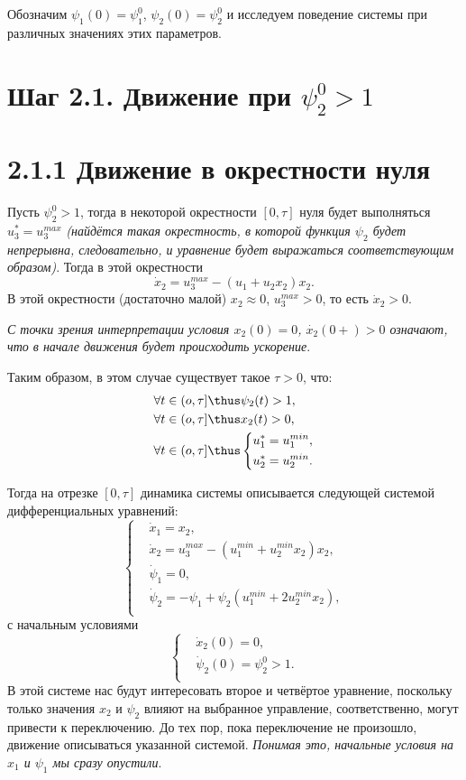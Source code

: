 Обозначим $\psi_1(0) = \psi_1^0$, $\psi_2(0) = \psi_2^0$ и исследуем поведение системы при различных значениях этих параметров.

\section*{Шаг 2.1. Движение при $\psi_2^0 > 1$}
\section*{2.1.1 Движение в окрестности нуля}
Пусть $\psi_2^0 > 1$, тогда в некоторой окрестности $[0, \tau]$ нуля будет выполняться $u_3^* = u_3^{max}$ \textit{(найдётся такая окрестность, в которой функция $\psi_2$ будет непрерывна, следовательно, и уравнение будет выражаться соответствующим образом)}. Тогда в этой окрестности
$$
    \dot{x}_2 = u_3^{max} - (u_1 + u_2 x_2) x_2.
$$
В этой окрестности (достаточно малой) $x_2 \approx 0$, $u_3^{max} > 0$, то есть $\dot{x}_2 > 0$.

\textit{С точки зрения интерпретации условия $x_2(0) = 0$, $\dot{x_2}(0+) > 0$ означают, что в начале движения будет происходить ускорение}.

Таким образом, в этом случае существует такое $\tau > 0$, что:
$$
\begin{aligned}
    & \forall t \in (o, \tau] \thus \psi_2(t) > 1, \\
    & \forall t \in (o, \tau] \thus x_2(t) > 0, \\
    & \forall t \in (o, \tau] \thus \left\{ \begin{aligned} & u_1^* = u_1^{min}, \\ & u_2^* = u_2^{min}. \end{aligned} \right.
\end{aligned}
$$

Тогда на отрезке $[0, \tau]$ динамика системы описывается следующей системой дифференциальных уравнений:
$$
    \left\{
    \begin{aligned}
        & \dot{x}_1 = x_2, \\
        & \dot{x}_2 = u_3^{max} - (u_1^{min} + u_2^{min} x_2) x_2, \\
        & \dot{\psi}_1 = 0, \\
        & \dot{\psi}_2 = - \psi_1 + \psi_2 (u_1^{min} + 2 u_2^{min} x_2), \\
    \end{aligned}
    \right.
$$
с начальным условиями
$$
    \left\{
    \begin{aligned}
        & \dot{x}_2(0) = 0, \\
        & \dot{\psi}_2(0) = \psi_2^0 > 1. \\
    \end{aligned}
    \right.
$$
В этой системе нас будут интересовать второе и четвёртое уравнение, поскольку только значения $x_2$ и $\psi_2$ влияют на выбранное управление, соответственно, могут привести к переключению. До тех пор, пока переключение не произошло, движение описываться указанной системой. \textit{Понимая это, начальные условия на $x_1$ и $\psi_1$ мы сразу опустили}.

